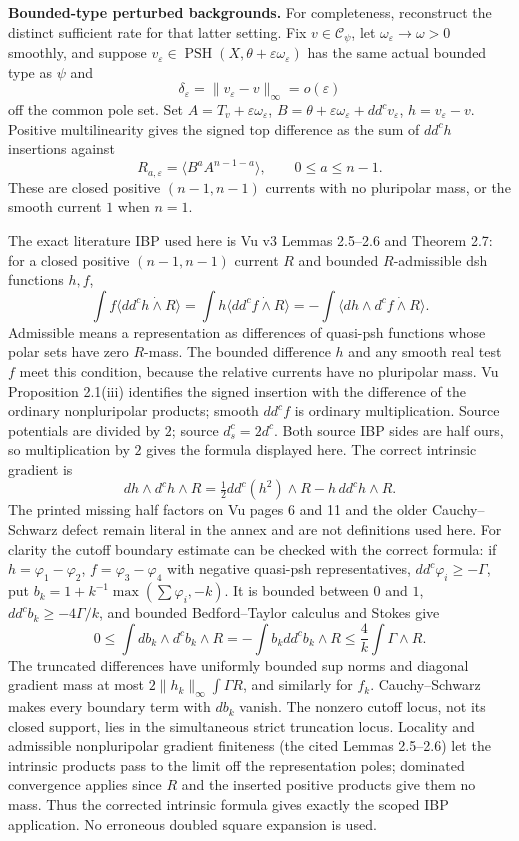 \documentclass[
  11pt,
]{article}
\begin{document}
\textbf{Bounded-type perturbed backgrounds.} For completeness,
reconstruct the distinct sufficient rate for that latter setting. Fix
\(v\in\mathcal{C}_\psi\), let \(\omega_\varepsilon\to\omega>0\) smoothly,
and suppose
\(v_\varepsilon\in\operatorname{PSH}(X,\theta+\varepsilon\omega_\varepsilon)\)
has the same actual bounded type as \(\psi\) and \[
\delta_\varepsilon=\|v_\varepsilon-v\|_\infty=o(\varepsilon)
\] off the common pole set. Set \(A=T_v+\varepsilon\omega_\varepsilon\),
\(B=\theta+\varepsilon\omega_\varepsilon+dd^cv_\varepsilon\),
\(h=v_\varepsilon-v\). Positive multilinearity gives the signed top
difference as the sum of \(dd^ch\) insertions against \[
R_{a,\varepsilon}=\langle B^aA^{n-1-a}\rangle,\qquad 0\leq a\leq n-1.
\] These are closed positive \((n-1,n-1)\) currents with no pluripolar
mass, or the smooth current \(1\) when \(n=1\).

The exact literature IBP used here is Vu v3 Lemmas 2.5--2.6 and Theorem
2.7: for a closed positive \((n-1,n-1)\) current \(R\) and bounded
\(R\)-admissible dsh functions \(h,f\), \[
\int f\langle dd^ch\mathbin{\dot\wedge}R\rangle
=\int h\langle dd^cf\mathbin{\dot\wedge}R\rangle
=-\int\langle dh\wedge d^cf\mathbin{\dot\wedge}R\rangle.
\] Admissible means a representation as differences of quasi-psh
functions whose polar sets have zero \(R\)-mass. The bounded difference
\(h\) and any smooth real test \(f\) meet this condition, because the
relative currents have no pluripolar mass. Vu Proposition 2.1(iii)
identifies the signed insertion with the difference of the ordinary
nonpluripolar products; smooth \(dd^cf\) is ordinary multiplication.
Source potentials are divided by \(2\); source \(d^c_s=2d^c\). Both
source IBP sides are half ours, so multiplication by \(2\) gives the
formula displayed here. The correct intrinsic gradient is \[
dh\wedge d^ch\wedge R=\tfrac12dd^c(h^2)\wedge R-h\,dd^ch\wedge R.
\] The printed missing half factors on Vu pages 6 and 11 and the older
Cauchy--Schwarz defect remain literal in the annex and are not
definitions used here. For clarity the cutoff boundary estimate can be
checked with the correct formula: if \(h=\varphi_1-\varphi_2\),
\(f=\varphi_3-\varphi_4\) with negative quasi-psh representatives,
\(dd^c\varphi_i\geq-\Gamma\), put
\(b_k=1+k^{-1}\max(\sum\varphi_i,-k)\). It is bounded between \(0\) and
\(1\), \(dd^cb_k\geq-4\Gamma/k\), and bounded Bedford--Taylor calculus
and Stokes give \[
0\leq\int db_k\wedge d^cb_k\wedge R
=-\int b_kdd^cb_k\wedge R\leq\frac4k\int\Gamma\wedge R.
\] The truncated differences have uniformly bounded sup norms and
diagonal gradient mass at most \(2\|h_k\|_\infty\int\Gamma R\), and
similarly for \(f_k\). Cauchy--Schwarz makes every boundary term with
\(db_k\) vanish. The nonzero cutoff locus, not its closed support, lies
in the simultaneous strict truncation locus. Locality and admissible
nonpluripolar gradient finiteness (the cited Lemmas 2.5--2.6) let the
intrinsic products pass to the limit off the representation poles;
dominated convergence applies since \(R\) and the inserted positive
products give them no mass. Thus the corrected intrinsic formula gives
exactly the scoped IBP application. No erroneous doubled square
expansion is used.
\end{document}
